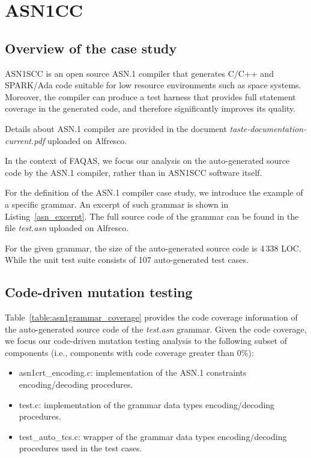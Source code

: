 
\section{ASN1CC}
\label{sec:caseStudies:GSL:ASN1}

\subsection{Overview of the case study}

ASN1SCC is an open source ASN.1 compiler that generates C/C++ and SPARK/Ada code suitable for low resource environments such as space systems. Moreover, the compiler can produce a test harness that provides full statement coverage in the generated code, and therefore significantly improves its quality.

Details about ASN.1 compiler are provided in the document \emph{taste-documentation-current.pdf} uploaded on Alfresco.

In the context of FAQAS, we focus our analysis on the auto-generated source code by the ASN.1 compiler, rather than in ASN1SCC software itself.

For the definition of the ASN.1 compiler case study, we introduce the example of a specific grammar. An excerpt of such grammar is shown in Listing~\ref{asn_excerpt}. The full source code of the grammar can be found in the file \emph{test.asn} uploaded on Alfresco.

For the given grammar, the size of the auto-generated source code is 4\,338 LOC. While the unit test suite consists of 107 auto-generated test cases.



\subsection{Code-driven mutation testing}



Table~\ref{table:asn1grammar_coverage} provides the code coverage information of the auto-generated source code of the \emph{test.asn} grammar. Given the code coverage, we focus our code-driven mutation testing analysis to the following subset of components (i.e., components with code coverage greater than 0\%):

\begin{itemize}
	\item asn1crt\_encoding.c: implementation of the ASN.1 constraints encoding/decoding procedures.
	\item test.c: implementation of the grammar data types encoding/decoding procedures.
	\item test\_auto\_tcs.c: wrapper of the grammar data types encoding/decoding procedures used in the test cases.
\end{itemize}

